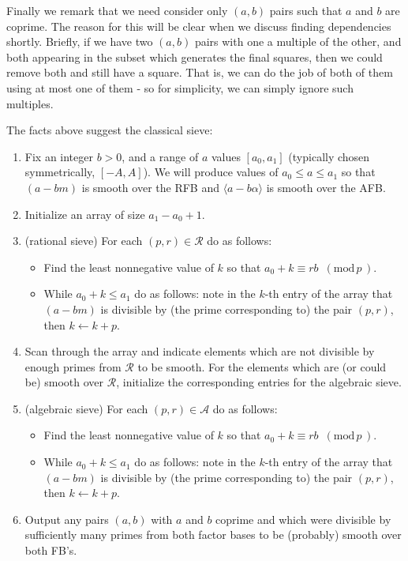 \documentclass[12pt]{article}
\newcommand{\rfb}{\mathcal{R}}
\newcommand{\afb}{\mathcal{A}}
\newcommand{\md}[1]{\,\,\, ( \mathrm{mod}\, #1 \,) }
\newcommand{\ideal}[1]{{\langle #1 \rangle}}
\begin{document}
  Finally we remark that we need consider only $(a,b)$ pairs such
  that $a$ and $b$ are coprime. The reason for this will be clear
  when we discuss finding dependencies shortly. Briefly, if
  we have two $(a,b)$ pairs with one a multiple of the other,
  and both appearing in the subset which generates the final squares,
  then we could remove both and still have a square. That is,
  we can do the job of both of them using at most one of them - 
  so for simplicity, we can simply ignore such multiples.

  The facts above suggest the classical sieve:
  \begin{enumerate}
    \item
      Fix an integer $b>0$, and a range of $a$ values
      $[a_0, a_1]$ (typically chosen symmetrically, $[-A, A]$).
      We will produce values of $a_0\le a\le a_1$ so that
      $(a-bm)$ is smooth over the RFB and $\ideal{a-b\alpha}$
      is smooth over the AFB.
    \item
      Initialize an array of size $a_1-a_0+1$.
    \item (rational sieve)
      For each $(p,r)\in\rfb$ do as follows:
      \begin{itemize}
        \item
          Find the least nonnegative value of $k$ so that
          $a_0+k\equiv rb\md{p}$.
        \item
          While $a_0+k \le a_1$ do as follows:
            note in the $k$-th entry of the array that
            $(a-bm)$ is divisible by (the prime corresponding to)
            the pair $(p,r)$, then $k\gets k+p$.
      \end{itemize}
    \item
      Scan through the array and indicate elements which
      are not divisible by enough primes from $\rfb$ to
      be smooth. For the elements which are (or could be)
      smooth over $\rfb$, initialize the corresponding entries
      for the algebraic sieve.
    \item (algebraic sieve)
      For each $(p,r)\in\afb$ do as follows:
      \begin{itemize}
        \item
          Find the least nonnegative value of $k$ so that
          $a_0+k\equiv rb\md{p}$.
        \item
          While $a_0+k \le a_1$ do as follows:
            note in the $k$-th entry of the array that
            $(a-bm)$ is divisible by (the prime corresponding to)
            the pair $(p,r)$, then $k\gets k+p$.
      \end{itemize}
    \item
      Output any pairs $(a,b)$ with $a$ and $b$ coprime and which
      were divisible by sufficiently many primes from both
      factor bases to be (probably) smooth over both FB's.
  \end{enumerate} 
\end{document}
